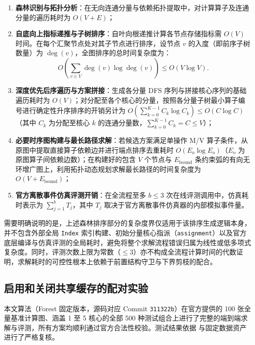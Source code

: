 \documentclass[anonymous,withtoc]{gmcm2026}
\providecommand{\tightlist}{\setlength{\itemsep}{0pt}\setlength{\parskip}{0pt}}
\begin{document}
\begin{enumerate}
\def\labelenumi{\arabic{enumi}.}
\tightlist
\item
  \textbf{森林识别与拓扑分析}：在无向连通分量与依赖拓扑提取中，对计算算子及连通分量的遍历耗时为 \(O(V + E)\)；
\item
  \textbf{自底向上指标递推与子树排序}：自叶向根递推计算各节点存储指标需 \(O(V)\) 时间。在每个汇聚节点处对其子节点进行排序，设节点 \(v\) 的入度（即前序子树数量）为 \(\deg(v)\)，全图排序的总时间复杂度为： \begin{equation}
O\left( \sum_{v \in V} \deg(v) \log \deg(v) \right) \le O(V \log V).
\end{equation}
\item
  \textbf{深度优先后序遍历与方案拼接}：生成各分量 DFS 序列与拼接核心序列的基础遍历耗时为 \(O(V)\)；对分配至各个核心的分量，按照各分量子树最小算子编号进行确定性升序排序的开销另计为 \(O\left(\sum_{k=0}^{K-1} C_k \log C_k\right) \le O(C \log C)\)（其中 \(C_k\) 为分配至核心 \(k\) 的连通分量数，\(\sum_{k=0}^{K-1} C_k = C \le V\)）；
\item
  \textbf{必要时序图构建与最长路径求解}：若候选方案满足单操作 M/V 算子条件，从原图中提取直接算子依赖边并进行端点排序去重耗时 \(O(E_o \log E_o)\)（\(E_o\) 为原图算子间依赖边数）；在构建好的包含 \(V\) 个节点与 \(E_{\mathrm{bound}}\) 条约束弧的有向无环增广图上，利用拓扑动态规划求解最长路径的时间复杂度为 \(O(V + E_{\mathrm{bound}})\)；
\item
  \textbf{官方离散事件仿真评测开销}：在全流程至多 \(b \le 3\) 次在线评测调用中，仿真耗时表示为 \(\sum_{j=1}^b T_j\)，其中 \(T_j\) 取决于官方离散事件仿真器的内部模拟事件量。
\end{enumerate}

需要明确说明的是，上述森林排序部分的复杂度界仅适用于该排序生成逻辑本身，并不包含外部全局 \texttt{Index} 索引构建、初始分量核心指派（\texttt{assignment}）以及官方底层编译与仿真评测的全局耗时，避免将整个求解流程错误归属为线性或低多项式复杂度。同时，评测次数上限为常数（\(\le 3\)）亦不构成全流程计算时间的代数证明，求解耗时的可控性根本上依赖于前置结构守卫与下界剪枝的配合。

\subsection{启用和关闭共享缓存的配对实验}

本文算法（Forest 固定版本，源码对应 Commit \texttt{311322b}）在官方提供的 100 张全量基准计算图、涵盖 1 至 5 核心的全部 500 种测试组合上进行了完整的端到端求解与评测，所有方案均顺利通过官方合法性校验。测试结果依据 \texttt{} 与固定数据资产进行了严格复核。
\end{document}
